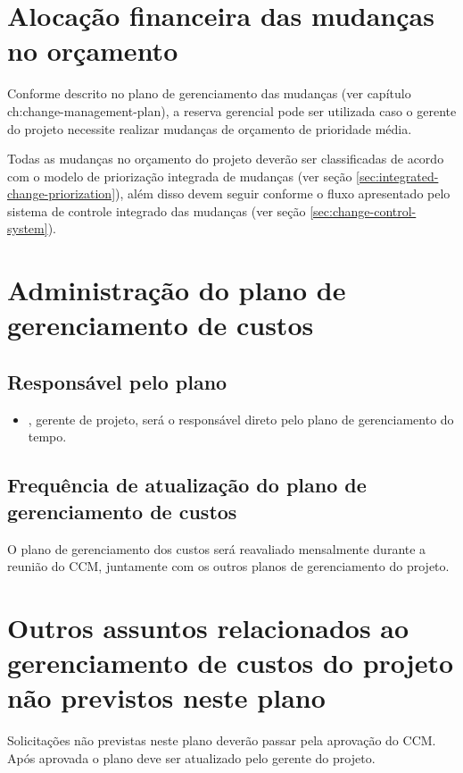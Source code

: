 \section{Alocação financeira das mudanças no orçamento}

Conforme descrito no plano de gerenciamento das mudanças (ver capítulo ch:change-management-plan), a reserva gerencial pode ser utilizada caso o gerente do projeto necessite realizar mudanças de orçamento de prioridade média.

Todas as mudanças no orçamento do projeto deverão ser classificadas de acordo com o modelo de priorização integrada de mudanças (ver seção \ref{sec:integrated-change-priorization}), além disso devem seguir conforme o fluxo apresentado pelo sistema de controle integrado das mudanças (ver seção \ref{sec:change-control-system}).

\section{Administração do plano de gerenciamento de custos}

\subsection{Responsável pelo plano}

\begin{itemize}
	\item \projectManagerName{}, gerente de projeto, será o responsável direto pelo plano de gerenciamento do tempo.
\end{itemize}

\subsection{Frequência de atualização do plano de gerenciamento de custos}

O plano de gerenciamento dos custos será reavaliado mensalmente durante a reunião do CCM, juntamente com os outros planos de gerenciamento do projeto.

\section{Outros assuntos relacionados ao gerenciamento de custos do projeto não previstos neste plano}

Solicitações não previstas neste plano deverão passar pela aprovação do CCM. Após aprovada o plano deve ser atualizado pelo gerente do projeto.

